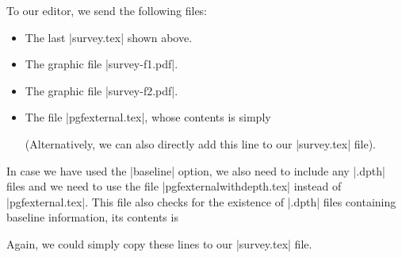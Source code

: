 To our editor, we send the following files:
\begin{itemize}
\item The last |survey.tex| shown above.
\item The graphic file |survey-f1.pdf|.
\item The graphic file |survey-f2.pdf|.
\item The file |pgfexternal.tex|, whose contents is simply
\begin{codeexample}
\long{}
\end{codeexample}
  (Alternatively, we can also directly add this line to our
  |survey.tex| file).
\end{itemize}
In case we have used the |baseline| option, we also need to include any |.dpth| files and we need to use the file |pgfexternalwithdepth.tex| instead of |pgfexternal.tex|. This file also checks for the existence of |.dpth| files containing baseline information, its contents is
\begin{codeexample}
\long{}
\end{codeexample}
Again, we could simply copy these lines to our |survey.tex| file.


